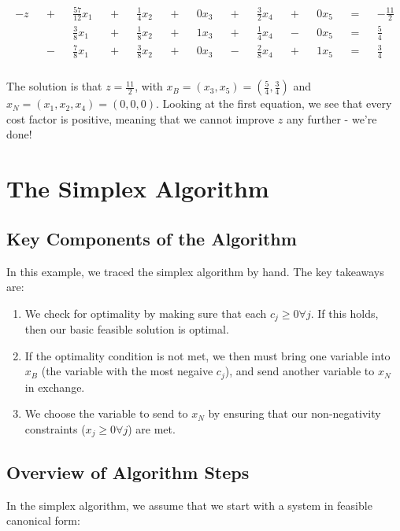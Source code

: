 \begin{eqnarray}
\begin{aligned}
-z && + && \frac{57}{12} x_1 &&+&& \frac{1}{4}x_2 && + && 0x_3 && + && \frac{3}{2}x_4 && + && 0x_5 &&=&&-\frac{11}{2}& \\
&&&& \frac{3}{8}x_1 &&+&& \frac{1}{8}x_2 &&+ && 1x_3 && + && \frac{1}{4}x_4 & &- && 0x_5 &&=&& \frac{5}{4} & \\
&&-&& \frac{7}{8}x_1 &&+&& \frac{3}{8}x_2 && + && 0x_3 && - && \frac{2}{8}x_4 && + && 1x_5 &&=&& \frac{3}{4} & \\
\end{aligned}
\end{eqnarray}

The solution is that $z = \frac{11}{2}$, with $x_B = (x_3, x_5) = (\frac{5}{4}, \frac{3}{4})$ and $x_N = (x_1,x_2,x_4) = (0,0,0)$. Looking at the first equation, we see that every cost factor is positive, meaning that we cannot improve $z$ any further - we're done!

\section{The Simplex Algorithm}

\subsection{Key Components of the Algorithm}
In this example, we traced the simplex algorithm by hand. The key takeaways are:

\begin{enumerate}
\item
We check for optimality by making sure that each $c_j \geq 0 \forall j$. If this holds, then our basic feasible solution is optimal.
\item
If the optimality condition is not met, we then must bring one variable into $x_B$ (the variable with the most negaive $c_j$), and send another variable to $x_N$ in exchange.
\item
We choose the variable to send to $x_N$ by ensuring that our non-negativity constraints ($x_j \geq 0 \forall j$) are met.
\end{enumerate}
\subsection{Overview of Algorithm Steps}

In the simplex algorithm, we assume that we start with a system in feasible canonical form:


